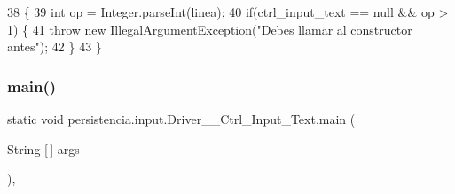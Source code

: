 \begin{DoxyCode}
38                                                                                           \{
39         \textcolor{keywordtype}{int} op = Integer.parseInt(linea);
40         \textcolor{keywordflow}{if}(ctrl\_input\_text == null && op > 1) \{
41             \textcolor{keywordflow}{throw} \textcolor{keyword}{new} IllegalArgumentException(\textcolor{stringliteral}{"Debes llamar al constructor antes"});
42         \}
43     \}
\end{DoxyCode}
\mbox{\label{classpersistencia_1_1input_1_1Driver____Ctrl__Input__Text_a38cebd4cadb9198cb6a2c87147646ec0}} 
\subsubsection{\texorpdfstring{main()}{main()}}
{\footnotesize\ttfamily static void persistencia.\+input.\+Driver\+\_\+\+\_\+\+Ctrl\+\_\+\+Input\+\_\+\+Text.\+main (\begin{DoxyParamCaption}\item[{String \mbox{[}$\,$\mbox{]}}]{args }\end{DoxyParamCaption})\hspace{0.3cm}{\ttfamily [inline]}, {\ttfamily [static]}}


